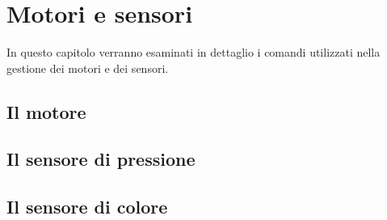 \chapter{Motori e sensori}
In questo capitolo verranno esaminati in dettaglio
i comandi utilizzati nella gestione dei motori
e dei sensori.

\section{Il motore}


\section{Il sensore di pressione}

\section{Il sensore di colore}
